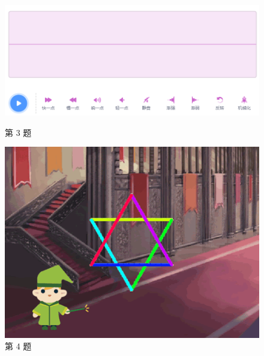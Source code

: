 \documentclass[10pt, a4paper]{article}
\begin{document}
\begin{enumerate}
        \begin{figure}[htbp]
            \centering
            \begin{minipage}[t]{.35\textwidth}
                \centering
                \includegraphics[width=\textwidth]{figure/3.png}
                \caption*{第 3 题}
            \end{minipage}
            \begin{minipage}[t]{.2\textwidth}
                \centering
                \includegraphics[width=\textwidth]{figure/4.png}
                \caption*{第 4 题}
            \end{minipage}
            \begin{minipage}[t]{.3\textwidth}
                \centering
                \begin{minipage}[t]{.55\textwidth}
                    \centering

\end{minipage}
\end{minipage}
\end{figure}
\end{enumerate}
\end{document}
